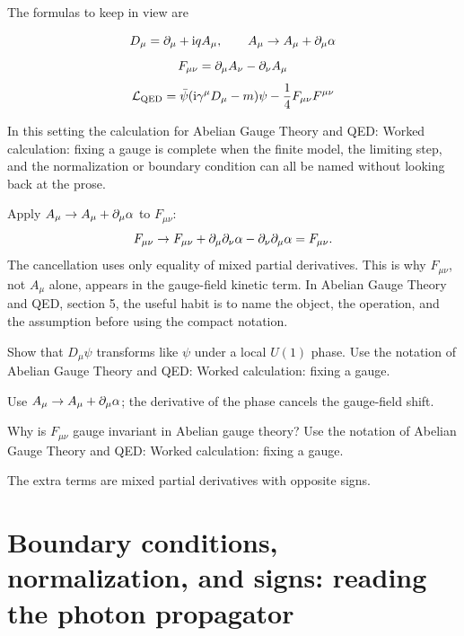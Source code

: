 The formulas to keep in view are

\[
  D_\mu=\partial_\mu+\mathrm i qA_\mu,\qquad A_\mu\to A_\mu+\partial_\mu\alpha
\]
\[
  F_{\mu\nu}=\partial_\mu A_\nu-\partial_\nu A_\mu
\]
\[
  \mathcal L_{\mathrm{QED}}=\bar\psi(\mathrm i\gamma^\mu D_\mu-m)\psi-\frac14F_{\mu\nu}F^{\mu\nu}
\]

In this setting the calculation for Abelian Gauge Theory and QED: Worked calculation: fixing a gauge is complete when the finite model, the limiting step, and the normalization or boundary condition can all be named without looking back at the prose.




\begin{example}
Apply \(A_\mu\to A_\mu+\partial_\mu\alpha\) to \(F_{\mu\nu}\):
\[
  F_{\mu\nu}\to F_{\mu\nu}+\partial_\mu\partial_\nu\alpha-\partial_\nu\partial_\mu\alpha=F_{\mu\nu}.
\]
The cancellation uses only equality of mixed partial derivatives.  This is why \(F_{\mu\nu}\), not \(A_\mu\) alone, appears in the gauge-field kinetic term.  In Abelian Gauge Theory and QED, section 5, the useful habit is to name the object, the operation, and the assumption before using the compact notation.
\end{example}



\begin{exercise}
Show that \(D_\mu\psi\) transforms like \(\psi\) under a local \(U(1)\) phase.  Use the notation of Abelian Gauge Theory and QED: Worked calculation: fixing a gauge.
\begin{answer}
Use \(A_\mu\to A_\mu+\partial_\mu\alpha\); the derivative of the phase cancels the gauge-field shift.
\end{answer}
\end{exercise}

\begin{exercise}
Why is \(F_{\mu\nu}\) gauge invariant in Abelian gauge theory?  Use the notation of Abelian Gauge Theory and QED: Worked calculation: fixing a gauge.
\begin{answer}
The extra terms are mixed partial derivatives with opposite signs.
\end{answer}
\end{exercise}



\section{Boundary conditions, normalization, and signs: reading the photon propagator}

